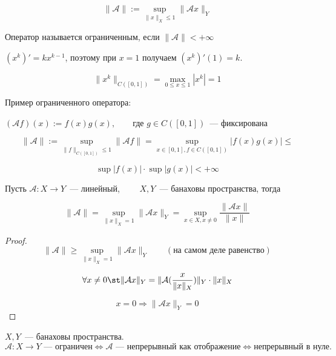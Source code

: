 \[ \|\mathcal{A}\|:= \sup_{\|x\|_X \le 1}\|\mathcal{A}x\|_Y \]

Оператор называется ограниченным, если $ \|\mathcal{A}\|   <  +\infty$

\begin{Example}{}{}
	$(x^k)' = kx^{k-1}$, поэтому при $x=1$ получаем $(x^k)'(1)=k$.
	
	\[
	\|x^k\| _{C([0, 1])} = \max_{0 \le x \le 1} |x^k| = 1
	\]
	
	Пример ограниченного оператора:
	
	$(\mathcal{A}f)(x) := f(x)g(x), \qquad \text{где }  g \in C([0,1])$~--- фиксирована
	
	\[  \|\mathcal{A}\|  := \sup_{\|f\|_{C([0,1])} \le 1}  \|\mathcal{A}f\|  = \sup_{x \in [0, 1], f \in C([0,1 ])} |f(x)g(x)| \le \]
	
	\[ \sup |f(x)| \cdot \sup |g(x)|  < +\infty \]
\end{Example}

\begin{Proposition}{}{}
	Пусть $\mathcal{A} \colon X \rightarrow Y$~--- линейный, $\qquad X, Y$~--- банаховы пространства, тогда
	
	\[  \|\mathcal{A}\|  = \sup_{ \|x\| _X = 1} \|\mathcal{A}x\| _Y = \sup_{x \in X, x \neq 0} \frac{ \|\mathcal{A}x\| }{ \|x\| } \]
\end{Proposition}

\begin{proof}
	
	\[  \|\mathcal{A}\|  \ge \sup_{ \|x\| _X = 1}  \|\mathcal{A}x\| _Y \qquad (\text{на самом деле равенство})\]
	
	\[ \forall x \neq 0 \st  \|\mathcal{A}x\| _Y =  \|\mathcal{A}(\frac{x}{\| x \|_X})\| _Y\cdot  \|x\| _X \]
	
	\[ x = 0 \Rightarrow  \|\mathcal{A}x\| _Y = 0 \]
\end{proof}

\begin{Proposition}{}{}
	
	$X, Y$~--- банаховы пространства.
	\[
	\mathcal{A} \colon X \rightarrow Y \text{~--- ограничен} \Leftrightarrow \mathcal{A} \text{~--- непрерывный как отображение}  \Leftrightarrow \text{непрерывный в нуле.}
	\]
	
\end{Proposition}

